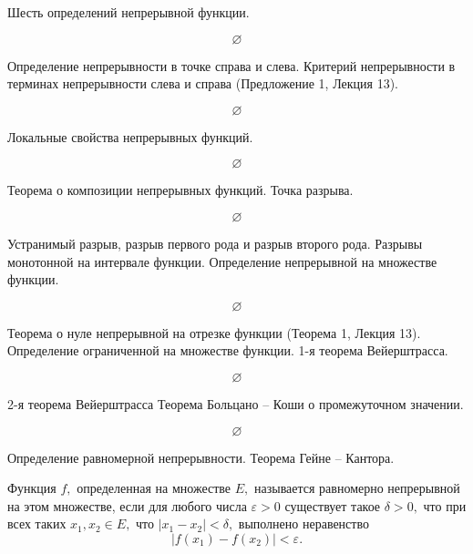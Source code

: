 \newpage
\begin{problem}
Шесть определений непрерывной функции.
\end{problem}

$$\varnothing$$

\newpage
\begin{problem}
Определение непрерывности в точке справа и слева. Критерий непрерывности в терминах непрерывности слева и справа (Предложение 1, Лекция 13).
\end{problem}

$$\varnothing$$

\newpage
\begin{problem}
Локальные свойства непрерывных функций.
\end{problem}

$$\varnothing$$

\newpage
\begin{problem}
Теорема о композиции непрерывных функций. Точка разрыва.
\end{problem}

$$\varnothing$$

\newpage
\begin{problem}
Устранимый разрыв, разрыв первого рода и разрыв второго рода. Разрывы монотонной
на интервале функции. Определение непрерывной на множестве функции.
\end{problem}

$$\varnothing$$

\newpage
\begin{problem}
Теорема о нуле непрерывной на отрезке функции (Теорема 1, Лекция 13). Определение
ограниченной на множестве функции. 1-я теорема Вейерштрасса.
\end{problem}

$$\varnothing$$

\newpage
\begin{problem}
2-я теорема Вейерштрасса Теорема Больцано – Коши о промежуточном значении.
\end{problem}

$$\varnothing$$

\newpage
\begin{problem}
Определение равномерной непрерывности. Теорема Гейне – Кантора.
\end{problem}

\begin{definition}
    Функция $f,$ определенная на множестве $E,$
    называется равномерно непрерывной на этом множестве,
    если для любого числа $\varepsilon>0$ существует
    такое $\delta>0,$ что при всех таких
    $x_1, x_2\in E,$ что $|x_1-x_2|<\delta,$ выполнено
    неравенство
    $$
        |f(x_1)-f(x_2)|<\varepsilon.
    $$
\end{definition}

